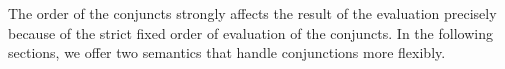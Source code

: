 The order of the conjuncts strongly affects the result of the evaluation precisely because of the strict fixed order of evaluation of the conjuncts. In the following sections, we offer two semantics that handle conjunctions more flexibly.
